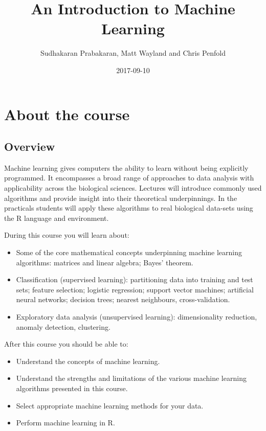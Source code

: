 \documentclass[]{book}
\title{An Introduction to Machine Learning}
\author{Sudhakaran Prabakaran, Matt Wayland and Chris Penfold}
\date{2017-09-10}
\providecommand{\tightlist}{%
  \setlength{\itemsep}{0pt}\setlength{\parskip}{0pt}}
\theoremstyle{definition}
\theoremstyle{definition}
\theoremstyle{definition}
\theoremstyle{remark}
\begin{document}
\maketitle

{
\setcounter{tocdepth}{1}
\tableofcontents
}
\chapter{About the course}\label{about-the-course}

\section{Overview}\label{overview}

Machine learning gives computers the ability to learn without being
explicitly programmed. It encompasses a broad range of approaches to
data analysis with applicability across the biological sciences.
Lectures will introduce commonly used algorithms and provide insight
into their theoretical underpinnings. In the practicals students will
apply these algorithms to real biological data-sets using the R language
and environment.

During this course you will learn about:

\begin{itemize}
\tightlist
\item
  Some of the core mathematical concepts underpinning machine learning
  algorithms: matrices and linear algebra; Bayes' theorem.
\item
  Classification (supervised learning): partitioning data into training
  and test sets; feature selection; logistic regression; support vector
  machines; artificial neural networks; decision trees; nearest
  neighbours, cross-validation.
\item
  Exploratory data analysis (unsupervised learning): dimensionality
  reduction, anomaly detection, clustering.
\end{itemize}

After this course you should be able to:

\begin{itemize}
\tightlist
\item
  Understand the concepts of machine learning.
\item
  Understand the strengths and limitations of the various machine
  learning algorithms presented in this course.
\item
  Select appropriate machine learning methods for your data.
\item
  Perform machine learning in R.
\end{itemize}
\end{document}
